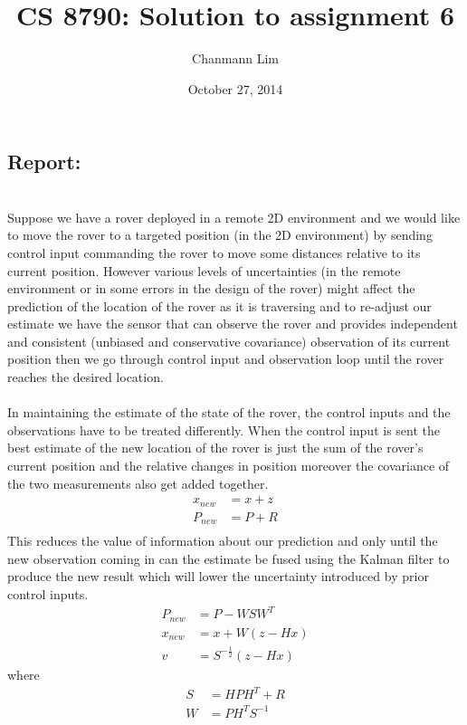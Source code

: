 \documentclass[a4paper]{article}
\begin{document}
\title{CS 8790: Solution to assignment 6}
\author{Chanmann Lim}
\date{October 27, 2014}
\maketitle

\subsection*{Report:} ~\\
\indent Suppose we have a rover deployed in a remote 2D environment and we would like to move the rover to a targeted position (in the 2D environment) by sending control input commanding the rover to move some distances relative to its current position. However various levels of uncertainties (in the remote environment or in some errors in the design of the rover) might affect the prediction of the location of the rover as it is traversing and to re-adjust our estimate we have the sensor that can observe the rover and provides independent and consistent (unbiased and conservative covariance) observation of its current position then we go through control input and observation loop until the rover reaches the desired location. \\
\\
\indent In maintaining the estimate of the state of the rover, the control inputs and the observations have to be treated differently. When the control input is sent the best estimate of the new location of the rover is just the sum of the rover's current position and the relative changes in position moreover the covariance of the two measurements also get added together. \\
\begin{align*}
x_{new} &= x + z \\
P_{new} &= P + R \\
\end{align*}
This reduces the value of information about our prediction and only until the new observation coming in can the estimate be fused using the Kalman filter to produce the new result which will lower the uncertainty introduced by prior control inputs. \\
\begin{align*}
P_{new} &= P - WSW^{T}\\
x_{new} &= x + W(z - Hx)\\
v &= S^{-\frac{1}{2}}(z-Hx)
\end{align*}
where
\begin{align*}
S &= HPH^{T} + R\\
W &= PH^{T}S^{-1}
\end{align*}
\end{document}
